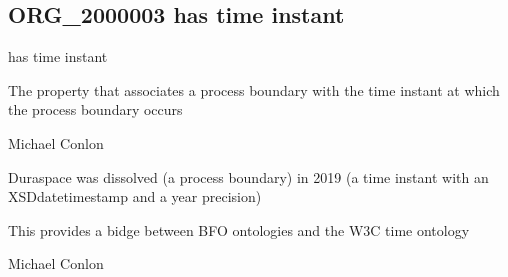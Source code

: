 \documentclass[letterpaper,10pt,english]{sphinxmanual}
\begin{document}
\subsection{ORG\_2000003 \sphinxhyphen{} has time instant}
\label{\detokenize{doc-ORG_2000003:org-2000003-has-time-instant}}\label{\detokenize{doc-ORG_2000003:index-0}}\label{\detokenize{doc-ORG_2000003::doc}}
\begin{sphinxShadowBox}

\sphinxAtStartPar
has time instant
\end{sphinxShadowBox}

\begin{sphinxShadowBox}

\sphinxAtStartPar
The property that associates a process boundary with the time instant at which the process boundary occurs
\end{sphinxShadowBox}

\begin{sphinxShadowBox}

\sphinxAtStartPar
Michael Conlon 
\end{sphinxShadowBox}

\begin{sphinxShadowBox}

\sphinxAtStartPar
Duraspace was dissolved (a process boundary) in 2019 (a time instant with an XSDdatetimestamp and a year precision)
\end{sphinxShadowBox}

\begin{sphinxShadowBox}

\sphinxAtStartPar
This provides a bidge between BFO ontologies and the W3C time ontology
\end{sphinxShadowBox}

\begin{sphinxShadowBox}

\sphinxAtStartPar
{}
\end{sphinxShadowBox}

\begin{sphinxShadowBox}

\sphinxAtStartPar
Michael Conlon 
\end{sphinxShadowBox}
\begin{quote}

\ignorespaces \end{quote}
\end{document}
